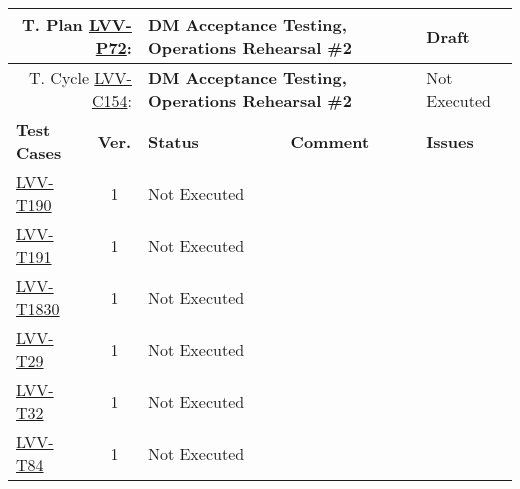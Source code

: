 \documentclass[DM,lsstdraft,STR,toc]{lsstdoc}
\begin{document}
{\small
\begin{longtable}{p{2cm}cp{2.3cm}p{8.6cm}p{2.3cm}}
\toprule
\multicolumn{2}{r}{ T. Plan \href{https://jira.lsstcorp.org/secure/Tests.jspa\#/testPlan/LVV-P72}{LVV-P72}:} &
\multicolumn{2}{p{10.9cm}}{\textbf{ DM Acceptance Testing, Operations Rehearsal \#2 }} & Draft \\\hline
\multicolumn{2}{r}{ T. Cycle \href{https://jira.lsstcorp.org/secure/Tests.jspa\#/testCycle/LVV-C154}{LVV-C154}:} &
\multicolumn{2}{p{10.9cm}}{\textbf{ DM Acceptance Testing, Operations Rehearsal \#2 }} & Not Executed \\\hline
\textbf{Test Cases} &  \textbf{Ver.} & \textbf{Status} & \textbf{Comment} & \textbf{Issues} \\\toprule
\href{https://jira.lsstcorp.org/secure/Tests.jspa#/testCase/LVV-T190}{LVV-T190}
&  1
& Not Executed &
\begin{minipage}[]{9cm}
\smallskip

\medskip
\end{minipage}
&
\\\hline
\href{https://jira.lsstcorp.org/secure/Tests.jspa#/testCase/LVV-T191}{LVV-T191}
&  1
& Not Executed &
\begin{minipage}[]{9cm}
\smallskip

\medskip
\end{minipage}
&
\\\hline
\href{https://jira.lsstcorp.org/secure/Tests.jspa#/testCase/LVV-T1830}{LVV-T1830}
&  1
& Not Executed &
\begin{minipage}[]{9cm}
\smallskip

\medskip
\end{minipage}
&
\\\hline
\href{https://jira.lsstcorp.org/secure/Tests.jspa#/testCase/LVV-T29}{LVV-T29}
&  1
& Not Executed &
\begin{minipage}[]{9cm}
\smallskip

\medskip
\end{minipage}
&
\\\hline
\href{https://jira.lsstcorp.org/secure/Tests.jspa#/testCase/LVV-T32}{LVV-T32}
&  1
& Not Executed &
\begin{minipage}[]{9cm}
\smallskip

\medskip
\end{minipage}
&
\\\hline
\href{https://jira.lsstcorp.org/secure/Tests.jspa#/testCase/LVV-T84}{LVV-T84}
&  1
& Not Executed &
\begin{minipage}[]{9cm}
\smallskip


\end{minipage}
\end{longtable}}
\end{document}
